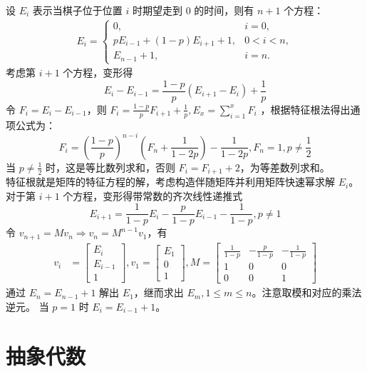 \documentclass[12pt,a4paper]{article}
\begin{document}
设 $E_i$ 表示当棋子位于位置 $i$ 时期望走到 $0$ 的时间，则有 $n+1$ 个方程：
\begin{align*}
	E_i = 
	\begin{cases}
		0, & i = 0, \\[6pt]
		pE_{i-1}+(1-p)E_{i+1}+1, & 0 < i < n, \\[6pt]
		E_{n-1}+1, & i = n.
	\end{cases}
\end{align*}
考虑第 $i+1$ 个方程，变形得 
\begin{equation*}
	\displaystyle E_i-E_{i-1}=\frac{1-p}{p}(E_{i+1}-E_i)+\frac{1}{p}
\end{equation*}
令 $F_i=E_i-E_{i-1}$，则 $\displaystyle F_i=\frac{1-p}{p}F_{i+1}+\frac{1}{p}, E_x=\sum_{i=1}^{x}F_i$ ，根据特征根法得出通项公式为： 
\begin{equation*}
	\displaystyle F_i=(\frac{1-p}{p})^{n-i}(F_n+\frac{1}{1-2p})-\frac{1}{1-2p} , F_n=1,p\ne\frac{1}{2}
\end{equation*}
当 $\displaystyle p\ne\frac{1}{2}$ 时，这是等比数列求和，否则 $F_i=F_{i+1}+2$，为等差数列求和。\\

特征根就是矩阵的特征方程的解，考虑构造伴随矩阵并利用矩阵快速幂求解 $E_i$。对于第 $i+1$ 个方程，变形得带常数的齐次线性递推式 \begin{equation*}
	\displaystyle E_{i+1}=\frac{1}{1-p}E_{i}-\frac{p}{1-p}E_{i-1}-\frac{1}{1-p},p\ne1
\end{equation*}
令 $v_{n+1}=Mv_n\Rightarrow v_n=M^{n-1}v_1$，有
\begin{align*}
	\displaystyle v_i&=\begin{bmatrix}E_i\\E_{i-1}\\1\end{bmatrix},v_1=\begin{bmatrix}E_1\\0\\1\end{bmatrix},M=\begin{bmatrix}\frac{1}{1-p} & -\frac{p}{1-p} & -\frac{1}{1-p}\\1 & 0 & 0\\0 & 0 & 1\end{bmatrix}
\end{align*}
通过 $E_n=E_{n-1}+1$ 解出 $E_1$，继而求出 $E_m,1\le m\le n$。注意取模和对应的乘法逆元。
当 $p=1$ 时 $E_i=E_{i-1}+1$。

\newpage
\part{抽象代数}
\end{document}
